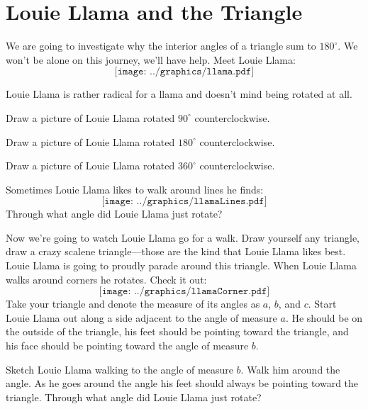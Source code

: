 \newpage
\section{Louie Llama and the Triangle} 


We are going to investigate why the interior angles of a triangle sum
to $180^\circ$. We won't be alone on this journey, we'll have help.
Meet Louie Llama:
\[
\texttt{[image: ../graphics/llama.pdf]}
\]

Louie Llama is rather radical for a llama and doesn't mind being
rotated at all.

\begin{prob} 
Draw a picture of Louie Llama rotated $90^\circ$ counterclockwise.
\end{prob}

\begin{prob} 
Draw a picture of Louie Llama rotated $180^\circ$ counterclockwise.
\end{prob}

\begin{prob} 
Draw a picture of Louie Llama rotated $360^\circ$ counterclockwise.
\end{prob}

\begin{prob} Sometimes Louie Llama likes to walk around lines he finds:
\[
\texttt{[image: ../graphics/llamaLines.pdf]}
\]
Through what angle did Louie Llama just rotate?
\end{prob}


Now we're going to watch Louie Llama go for a walk. Draw yourself any
triangle, draw a crazy scalene triangle---those are the kind that Louie
Llama likes best. Louie Llama is going to proudly parade around this
triangle. When Louie Llama walks around corners he rotates. Check
it out:
\[
\texttt{[image: ../graphics/llamaCorner.pdf]}
\]
Take your triangle and denote the measure of its angles as $a$, $b$,
and $c$. Start Louie Llama out along a side adjacent to the angle of
measure $a$. He should be on the outside of the triangle, his feet
should be pointing toward the triangle, and his face should be
pointing toward the angle of measure $b$.
\begin{prob} 
Sketch Louie Llama walking to the angle of measure $b$. Walk him
around the angle. As he goes around the angle his feet should always
be pointing toward the triangle. Through what angle did Louie Llama
just rotate?
\end{prob}

